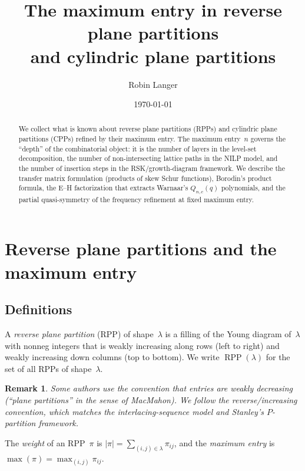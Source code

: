 \documentclass[11pt]{article}
\title{The maximum entry in reverse plane partitions\\
and cylindric plane partitions}
\author{Robin Langer}
\date{\today}
\newtheorem{remark}[theorem]{Remark}
\newcommand{\RPP}{\operatorname{RPP}}
\begin{document}
\maketitle

\begin{abstract}
We collect what is known about reverse plane partitions (RPPs)
and cylindric plane partitions (CPPs) refined by their maximum
entry. The maximum entry~$n$ governs the ``depth'' of the
combinatorial object: it is the number of layers in the
level-set decomposition, the number of non-intersecting lattice
paths in the NILP model, and the number of insertion steps in
the RSK/growth-diagram framework. We describe the transfer
matrix formulation (products of skew Schur functions),
Borodin's product formula, the E--H factorization that extracts
Warnaar's $Q_{n,c}(q)$ polynomials, and the partial
quasi-symmetry of the frequency refinement at fixed
maximum entry.
\end{abstract}

\tableofcontents

\section{Reverse plane partitions and the maximum entry}
\label{sec:rpp}

\subsection{Definitions}

A \emph{reverse plane partition} (RPP) of shape~$\lambda$ is a
filling of the Young diagram of~$\lambda$ with nonneg integers
that is weakly increasing along rows (left to right) and weakly
increasing down columns (top to bottom). We write $\RPP(\lambda)$
for the set of all RPPs of shape~$\lambda$.

\begin{remark}
Some authors use the convention that entries are weakly
\emph{decreasing} (``plane partitions'' in the sense of
MacMahon). We follow the reverse/increasing convention, which
matches the interlacing-sequence model and Stanley's
$P$-partition framework.
\end{remark}

The \emph{weight} of an RPP~$\pi$ is
$|\pi| = \sum_{(i,j) \in \lambda} \pi_{ij}$,
and the \emph{maximum entry} is
$\max(\pi) = \max_{(i,j)} \pi_{ij}$.
\end{document}
